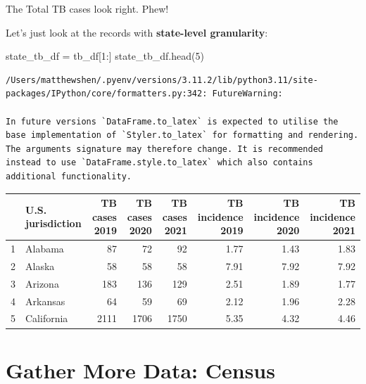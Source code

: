 \documentclass[
  letterpaper,
  DIV=11,
  numbers=noendperiod]{scrreprt}
\newenvironment{Shaded}{\begin{snugshade}}{\end{snugshade}}
\newcommand{\DecValTok}[1]{\textcolor[rgb]{0.68,0.00,0.00}{#1}}
\newcommand{\NormalTok}[1]{\textcolor[rgb]{0.00,0.23,0.31}{#1}}
\newcommand{\OperatorTok}[1]{\textcolor[rgb]{0.37,0.37,0.37}{#1}}
\begin{document}
The Total TB cases look right. Phew!

Let's just look at the records with \textbf{state-level granularity}:

\begin{Shaded}
\begin{Highlighting}[]
\NormalTok{state\_tb\_df }\OperatorTok{=}\NormalTok{ tb\_df[}\DecValTok{1}\NormalTok{:]}
\NormalTok{state\_tb\_df.head(}\DecValTok{5}\NormalTok{)}
\end{Highlighting}
\end{Shaded}

\begin{verbatim}
/Users/matthewshen/.pyenv/versions/3.11.2/lib/python3.11/site-packages/IPython/core/formatters.py:342: FutureWarning:

In future versions `DataFrame.to_latex` is expected to utilise the base implementation of `Styler.to_latex` for formatting and rendering. The arguments signature may therefore change. It is recommended instead to use `DataFrame.style.to_latex` which also contains additional functionality.
\end{verbatim}

\begin{tabular}{llrrrrrr}
\toprule
{} & U.S. jurisdiction &  TB cases 2019 &  TB cases 2020 &  TB cases 2021 &  TB incidence 2019 &  TB incidence 2020 &  TB incidence 2021 \\
\midrule
1 &           Alabama &             87 &             72 &             92 &               1.77 &               1.43 &               1.83 \\
2 &            Alaska &             58 &             58 &             58 &               7.91 &               7.92 &               7.92 \\
3 &           Arizona &            183 &            136 &            129 &               2.51 &               1.89 &               1.77 \\
4 &          Arkansas &             64 &             59 &             69 &               2.12 &               1.96 &               2.28 \\
5 &        California &           2111 &           1706 &           1750 &               5.35 &               4.32 &               4.46 \\
\bottomrule
\end{tabular}

\hypertarget{gather-more-data-census}{%
\section{Gather More Data: Census}\label{gather-more-data-census}}
\end{document}
